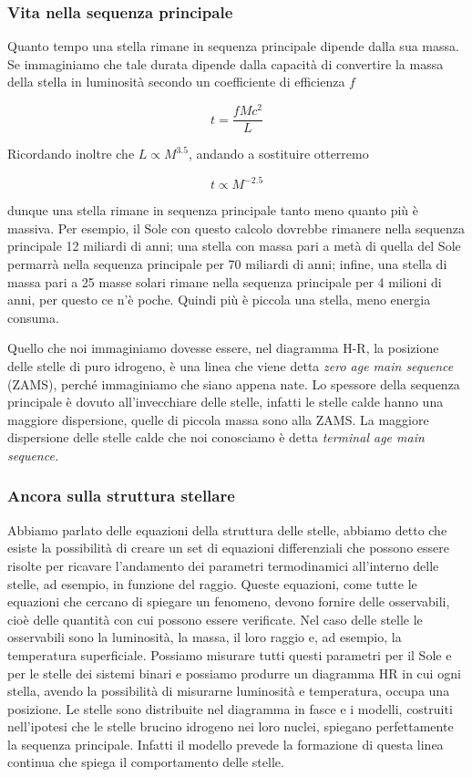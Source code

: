 \subsubsection{Vita nella sequenza principale}
Quanto tempo una stella rimane in sequenza principale dipende dalla sua massa. Se immaginiamo che tale durata dipende dalla capacità di convertire la massa della stella in luminosità secondo un coefficiente di efficienza $f$

$$t=\frac{fMc^2}{L}$$

Ricordando inoltre che $L\propto M^{3.5}$, andando a sostituire otterremo

$$t\propto M^{-2.5}$$

dunque una stella rimane in sequenza principale tanto meno quanto più è massiva. Per esempio, il Sole con questo calcolo dovrebbe rimanere nella sequenza principale 12 miliardi di anni; una stella con massa pari a metà di quella del Sole permarrà nella sequenza principale per 70 miliardi di anni; infine, una stella di massa pari a 25 masse solari rimane nella sequenza principale per 4 milioni di anni, per questo ce n'è poche. Quindi più è piccola una stella, meno energia consuma.

Quello che noi immaginiamo dovesse essere, nel diagramma H-R, la posizione delle stelle di puro idrogeno, è una linea che viene detta \textit{zero age main sequence} (ZAMS), perché immaginiamo che siano appena nate. Lo spessore della sequenza principale è dovuto all'invecchiare delle stelle, infatti le stelle calde hanno una maggiore dispersione, quelle di piccola massa sono alla ZAMS. La maggiore dispersione delle stelle calde che noi conosciamo è detta \textit{terminal age main sequence.} 


\subsubsection{Ancora sulla struttura stellare}
Abbiamo parlato delle equazioni della struttura delle stelle, abbiamo detto che esiste la possibilità di creare un set di equazioni differenziali che possono essere risolte per ricavare l'andamento dei parametri termodinamici all'interno delle stelle, ad esempio, in funzione del raggio. Queste equazioni, come tutte le equazioni che cercano di spiegare un fenomeno, devono fornire delle osservabili, cioè delle quantità con cui possono essere verificate. Nel caso delle stelle le osservabili sono la luminosità, la massa, il loro raggio e, ad esempio, la temperatura superficiale. Possiamo misurare tutti questi parametri per il Sole e per le stelle dei sistemi binari e possiamo produrre un diagramma HR in cui ogni stella, avendo la possibilità di misurarne luminosità e temperatura, occupa una posizione. Le stelle sono distribuite nel diagramma in fasce e i modelli, costruiti nell'ipotesi che le stelle brucino idrogeno nei loro nuclei, spiegano perfettamente la sequenza principale. Infatti il modello prevede la formazione di questa linea continua che spiega il comportamento delle stelle.

